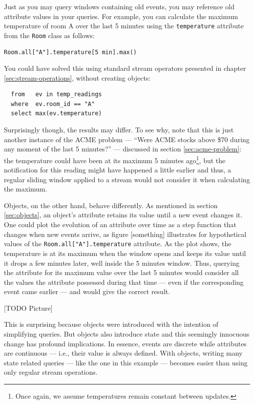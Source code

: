 \documentclass{report}
\begin{document}
Just as you may query windows containing old events, you may reference
old attribute values in your queries. For example, you can calculate
the maximum temperature of room A over the last 5 minutes using the
\verb=temperature= attribute from the \verb=Room= class as follows:

\begin{verbatim}
Room.all["A"].temperature[5 min].max()
\end{verbatim}

You could have solved this using standard stream operators presented
in chapter \ref{sec:stream-operations}, without creating objects:

\begin{lstlisting}
  from   ev in temp_readings
  where  ev.room_id == "A"
  select max(ev.temperature)
\end{lstlisting}

Surprisingly though, the results may differ. To see why, note that
this is just another instance of the ACME problem --- ``Were ACME
stocks above \$70 during any moment of the last 5 minutes?'' ---
discussed in section \ref{sec:acme-problem}: the temperature could have
been at its maximum 5 minutes ago\footnote{Once again, we assume
  temperatures remain constant between updates.}, but the notification
for this reading might have happened a little earlier and thus, a
regular sliding window applied to a stream would not consider it when
calculating the maximum.

Objects, on the other hand, behave differently. As mentioned in
section \ref{sec:objects}, an object's attribute retains its value
until a new event changes it. One could plot the evolution of an
attribute over time as a step function that changes when new events
arrive, as figure [something] illustrates for hypothetical values of
the \verb=Room.all["A"].temperature= attribute. As the plot shows, the
temperature is at its maximum when the window opens and keeps its
value until it drops a few minutes later, well inside the 5 minutes
window. Thus, querying the attribute for its maximum value over the
last 5 minutes would consider all the values the attribute possessed
during that time --- even if the corresponding event came earlier ---
and would give the correct result.

[TODO Picture]

This is surprising because objects were introduced with the intention
of simplifying queries. But objects also introduce state and this
seemingly innocuous change has profound implications. In essence,
events are discrete while attributes are continuous --- i.e., their
value is always defined. With objects, writing many state related
queries --- like the one in this example --- becomes easier than using
only regular stream operations.
\end{document}
